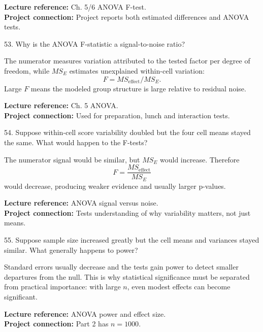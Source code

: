 \documentclass[10.5pt,a4paper]{article}
\newcommand{\chapref}[1]{\textbf{Lecture reference:} #1}
\newcommand{\projectref}[1]{\textbf{Project connection:} #1}
\begin{document}
\begin{refbox}\chapref{Ch. 5/6 ANOVA F-test.}\\\projectref{Project reports both estimated differences and ANOVA tests.}\end{refbox}
\begin{qbox}{53. Why is the ANOVA F-statistic a signal-to-noise ratio?}
\end{qbox}
\begin{answerbox}The numerator measures variation attributed to the tested factor per degree of freedom, while \(MS_E\) estimates unexplained within-cell variation:
\[
F=MS_{\text{effect}}/MS_E.
\]
Large \(F\) means the modeled group structure is large relative to residual noise.\end{answerbox}
\begin{refbox}\chapref{Ch. 5 ANOVA.}\\\projectref{Used for preparation, lunch and interaction tests.}\end{refbox}
\begin{qbox}{54. Suppose within-cell score variability doubled but the four cell means stayed the same. What would happen to the F-tests?}
\end{qbox}
\begin{answerbox}The numerator signal would be similar, but \(MS_E\) would increase. Therefore
\[
F=\frac{MS_{\text{effect}}}{MS_E}
\]
would decrease, producing weaker evidence and usually larger p-values.\end{answerbox}
\begin{refbox}\chapref{ANOVA signal versus noise.}\\\projectref{Tests understanding of why variability matters, not just means.}\end{refbox}
\begin{qbox}{55. Suppose sample size increased greatly but the cell means and variances stayed similar. What generally happens to power?}
\end{qbox}
\begin{answerbox}Standard errors usually decrease and the tests gain power to detect smaller departures from the null. This is why statistical significance must be separated from practical importance: with large \(n\), even modest effects can become significant.\end{answerbox}
\begin{refbox}\chapref{ANOVA power and effect size.}\\\projectref{Part 2 has $n=1000$.}\end{refbox}
\end{document}
